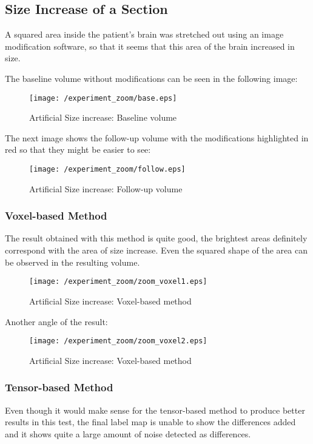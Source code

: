\subsection{Size Increase of a Section}
A squared area inside the patient's brain was stretched out using an
image modification software, so that it seems that this area of the
brain increased in size.

The baseline volume without modifications can be seen in the following
image:

\begin{figure}[H]
  \centering
  \texttt{[image: /experiment\_zoom/base.eps]}
  \caption{Artificial Size increase: Baseline volume}
  \label{zoom_base}
\end{figure}

The next image shows the follow-up volume with the modifications
highlighted in red so that they might be easier to see:

\begin{figure}[H]
  \centering
  \texttt{[image: /experiment\_zoom/follow.eps]}
  \caption{Artificial Size increase: Follow-up volume}
  \label{zoom_follow}
\end{figure}


\subsubsection{Voxel-based Method}
The result obtained with this method is quite good, the brightest
areas definitely correspond with the area of size increase. Even the
squared shape of the area can be observed in the resulting volume.

\begin{figure}[H]
  \centering
  \texttt{[image: /experiment\_zoom/zoom\_voxel1.eps]}
  \caption{Artificial Size increase: Voxel-based method}
  \label{zoom_voxel1}
\end{figure}

Another angle of the result:

\begin{figure}[H]
  \centering
  \texttt{[image: /experiment\_zoom/zoom\_voxel2.eps]}
  \caption{Artificial Size increase: Voxel-based method}
  \label{zoom_voxel2}
\end{figure}


\subsubsection{Tensor-based Method}
Even though it would make sense for the tensor-based method to produce
better results in this test, the final label map is unable to show the
differences added and it shows quite a large amount of noise detected
as differences.

